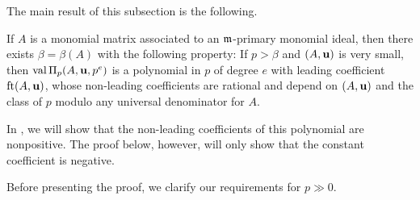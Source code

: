 \documentclass{amsart}
\begin{document}
The main result of this subsection is the following.

\begin{theorem}
   \label{m-primary AIP: T}
   If $A$ is a monomial matrix associated to an $\mathfrak{m}$-primary monomial ideal, then there exists $\beta=\beta(A)$ with the following property\textup:
   If $p > \beta$ and $(A,\mathbf{u})$ is very small, then $\operatorname{val} \Pi_p(A,\mathbf{u},p^e)$ is a polynomial in $p$ of degree $e$ with leading coefficient $\operatorname{ft}(A, \mathbf{u})$, whose non-leading coefficients are rational and depend on $(A,\mathbf{u})$ and the class of $p$ modulo any universal denominator for $A$.
\end{theorem}

\begin{remark}
   In , we will show that the non-leading coefficients of this polynomial are nonpositive.
   The proof below, however, will only show that the constant coefficient is negative.
\end{remark}

Before presenting the proof, we clarify our requirements for $p\gg 0$.
\end{document}
